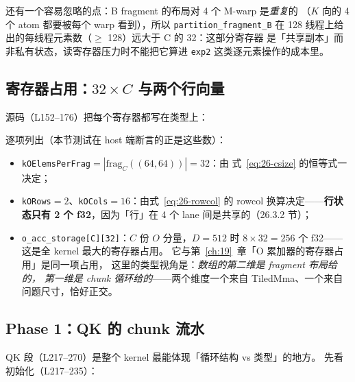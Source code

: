 还有一个容易忽略的点：B fragment 的布局对 4 个 M-warp 是\emph{重复}的
（$K$ 向的 4 个 atom 都要被每个 warp 看到），所以 \texttt{partition\_\allowbreak{}fragment\_\allowbreak{}B}
在 128 线程上给出的每线程元素数（$\ge$ 128）远大于 C 的 32：这部分寄存器
是「共享副本」而非私有状态，读寄存器压力时不能把它算进 \texttt{exp2}
这类逐元素操作的成本里。

\subsection{寄存器占用：$32\times C$ 与两个行向量}

源码（L152--176）把每个寄存器都写在类型上：



逐项列出（本节测试在 host 端断言的正是这些数）：

\begin{itemize}[itemsep=2pt,topsep=2pt]
  \item \texttt{k\allowbreak{}OElems\allowbreak{}Per\allowbreak{}Frag}$=|\mathrm{frag}_C((64,64))| = 32$：由
        式~\eqref{eq:26-csize} 的恒等式一决定；
  \item \texttt{kORows}$=2$、\texttt{kOCols}$=16$：由式~\eqref{eq:26-rowcol}
        的 rowcol 换算决定——\textbf{行状态只有 2 个 f32}，因为「行」在
        4 个 lane 间是共享的（26.3.2 节）；
  \item \texttt{o\_\allowbreak{}acc\_\allowbreak{}storage[C][32]}：$C$ 份 $O$ 分量，$D=512$ 时
        $8\times32=256$ 个 f32——这是全 kernel 最大的寄存器占用。
        它与第~\ref{ch:19}~章「O 累加器的寄存器占用」是同一项占用，
        这里的类型视角是：\emph{数组的第二维是 fragment 布局给的，
        第一维是 chunk 循环给的}——两个维度一个来自 TiledMma、一个来自
        问题尺寸，恰好正交。
\end{itemize}

\subsection{Phase 1：QK 的 chunk 流水}

QK 段（L217--270）是整个 kernel 最能体现「循环结构 vs 类型」的地方。
先看初始化（L217--235）：



